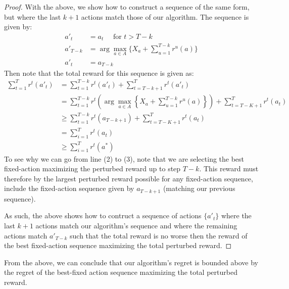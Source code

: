 \documentclass[12pt]{exam}
\begin{document}
\begin{questions}
\begin{solution}
\begin{enumerate}[label=(\alph*)]
\begin{proof}
        With the above, we show how to construct a sequence of the same form, but where the last $k + 1$ actions match those of our algorithm. The sequence is given by:
        \begin{align*}
          a'_t &= a_t \quad \text{ for } t > T-k \tag{The last $k$ actions match} \\
          a'_{T-k} &= \arg \max_{a \in A} \{ X_a + \sum_{u = 1}^{T-k} r^u(a) \} \tag{The $k+1$-th action from the end matches our algorithm} \\
          a'_t &= a_{T-k} \tag{All other actions are the same and match the $(T+k)$-th action}
        \end{align*}
        Then note that the total reward for this sequence is given as:
        \begin{align*}
          \sum_{t=1}^T r^t(a'_t) &= \sum_{t=1}^{T-k} r^t(a'_t) + \sum_{t=T-k+1}^T r^t(a'_t) \tag{Definition of total reward} \\
          &= \sum_{t=1}^{T-k} r^t\left(\arg \max_{a \in A} \left\{ X_a + \sum_{u=1}^{T-k} r^{u}(a) \right\}\right) + \sum_{t=T-K+1}^T r^t(a_t) \tag{Our new sequence} \\
          &\geq \sum_{t=1}^{T-k}r^t(a_{T-k+1}) + \sum_{t=T-K+1}^T r^t(a_t) \tag{See below} \\ 
          &=\sum_{i=1}^T r^t(a_t) \tag{We've recovered the previous sequence} \\
          &\geq \sum_{i=1}^T r^t(a^*) \tag{By the inductive hypothesis}
        \end{align*}
        To see why we can go from line (2) to (3), note that we are selecting the best fixed-action maximizing the perturbed reward up to step $T-k$. This reward must therefore by the largest perturbed reward possible for any fixed-action sequence, include the fixed-action sequence given by $a_{T-k+1}$ (matching our previous sequence).

        As such, the above shows how to contruct a sequence of actions $\{a'_t\}$ where the last $k+1$ actions match our algorithm's sequence and where the remaining actions match $a'_{T-k}$ such that the total reward is no worse then the reward of the best fixed-action sequence maximizing the total perturbed reward.
      \end{proof}

      From the above, we can conclude that our algorithm's regret is bounded above by the regret of the best-fixed action sequence maximizing the total perturbed reward.


\end{enumerate}
\end{solution}
\end{questions}
\end{document}
